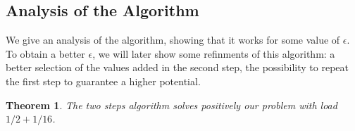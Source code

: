 \documentclass[10pt, conference, letterpaper]{IEEEtran}
\newtheorem{theorem}{Theorem}
\newtheorem{lemma}[theorem]{Lemma}
\begin{document}
% 
% 
% 
% 
% 
%  
% 


\subsection{Analysis of the Algorithm}


We give an analysis of the algorithm, showing that it works for some value
of $\epsilon$. To obtain a better $\epsilon$, we will later show some refinments of this algorithm: a better selection of the values added in the second step, the possibility to repeat the first step to guarantee a higher potential.


\begin{theorem}
The two steps algorithm solves positively our problem with load $1/2 + 1/16$.
\end{theorem}
\end{document}
